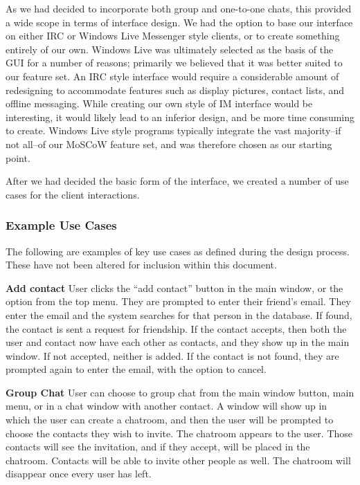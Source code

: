 As we had decided to incorporate both group and one-to-one chats, this provided a wide scope in terms of interface design. We had the option to base our interface on either IRC or Windows Live Messenger style clients, or to create something entirely of our own. Windows Live was ultimately selected as the basis of the GUI for a number of reasons; primarily we believed that it was better suited to our feature set. An IRC style interface would require a considerable amount of redesigning to accommodate features such as display pictures, contact lists, and offline messaging. While creating our own style of IM interface would be interesting, it would likely lead to an inferior design, and be more time consuming to create. Windows Live style programs typically integrate the vast majority--if not all--of our MoSCoW feature set, and was therefore chosen as our starting point.
 
After we had decided the basic form of the interface, we created a number of use cases for the client interactions.

\subsubsection{Example Use Cases}

The following are examples of key use cases as defined during the design process. These have not been altered for inclusion within this document.

{\bf Add contact}
User clicks the “add contact” button in the main window, or the option from the top menu. They are prompted to enter their friend’s email. They enter the email and the system searches for that person in the database. If found, the contact is sent a request for friendship. If the contact accepts, then both the user and contact now have each other as contacts, and they show up in the main window. If not accepted, neither is added. If the contact is not found, they are prompted again to enter the email, with the option to cancel.

{\bf Group Chat}
User can choose to group chat from the main window button, main menu, or in a chat window with another contact. A window will show up in which the user can create a chatroom, and then the user will be prompted to choose the contacts they wish to invite. The chatroom appears to the user. Those contacts will see the invitation, and if they accept, will be placed in the chatroom. Contacts will be able to invite other people as well. The chatroom will disappear once every user has left.

